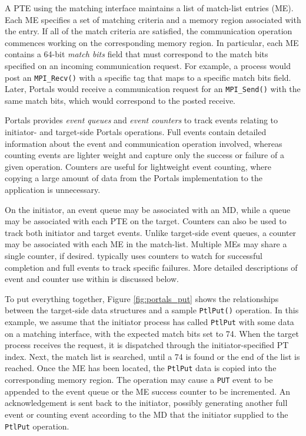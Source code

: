 A PTE using the matching interface maintains a list of match-list
entries (ME). Each ME specifies a set of matching criteria and a
memory region associated with the entry. If all of the match criteria
are satisfied, the communication operation commences working on the
corresponding memory region. In particular, each ME contains a 64-bit
{\em match bits} field that must correspond to the match bits
specified on an incoming communication request. For example, a process
would post an {\tt MPI\_Recv()} with a specific tag that maps to a
specific match bits field. Later, Portals would receive a
communication request for an {\tt MPI\_Send()} with the same match
bits, which would correspond to the posted receive.

Portals provides {\em event queues} and {\em event counters} to track
events relating to initiator- and target-side Portals operations.
Full events contain detailed information about the event and
communication operation involved, whereas counting events are lighter
weight and capture only the success or failure of a given operation.
Counters are useful for lightweight event counting, where copying a
large amount of data from the Portals implementation to the
application is unnecessary.

On the initiator, an event queue may be associated with an MD, while 
a queue may be associated with each PTE on the target. Counters can
also be used to track both initiator and target events. Unlike
target-side event queues, a counter may be associated with each ME in
the match-list. Multiple MEs may share a single counter, if
desired. \pdht typically uses counters to watch for successful
completion and full events to track specific failures. More detailed
descriptions of event and counter use within \pdht is discussed below.

To put everything together, Figure \ref{fig:portals_put} shows the
relationships between the target-side data structures and a sample
{\tt PtlPut()} operation. In this example, we assume that the
initiator process has called {\tt PtlPut} with some data on a matching
interface, with the expected match bits set to 74. When the target
process receives the request, it is dispatched through the
initiator-specified PT index. Next, the match list is searched, until
a 74 is found or the end of the list is reached. Once the ME has been
located, the {\tt PtlPut} data is copied into the corresponding memory
region. The operation may cause a {\tt PUT} event to be appended to
the event queue or the ME success counter to be incremented. An
acknowledgement is sent back to the initiator, possibly generating
another full event or counting event according to the MD that the initiator
supplied to the {\tt PtlPut} operation.




